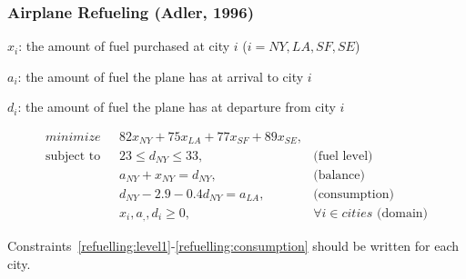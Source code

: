 \documentclass[11pt]{beamer}
\begin{document}
\begin{frame}
\frametitle{Airplane Refueling (Adler, 1996)}

\pause
$x_{i}$: the amount of fuel purchased at city $i$ ($i = NY,LA,SF,SE$)

$a_{i}$: the amount of fuel the plane has at arrival to city $i$ 

$d_{i}$: the amount of fuel the plane has at departure from city $i$ 

\pause
\begin{align}
\displaystyle minimize \mbox{ } & 82 x_{NY} + 75 x_{LA} + 77x_{SF} + 89 x_{SE}, \label{refuelling:objective} \\
% 
\mbox{subject to }&23 \leq d_{NY} \leq 33, & \mbox{(fuel level)}  \label{refuelling:level1}\\
& a_{NY} + x_{NY} = d_{NY},& \mbox{(balance)}  \label{refuelling:balance1}\\
& d_{NY} - 2.9 - 0.4d_{NY} = a_{LA},& \mbox{(consumption)} \label{refuelling:consumption}\\
&x_{i}, a_{,}, d_{i} \geq 0, & \forall i \in cities \mbox{ (domain)} \label{refuelling:domain}
\end{align}

Constraints~\eqref{refuelling:level1}-\eqref{refuelling:consumption} should be written for each city.
\end{frame}
\end{document}
